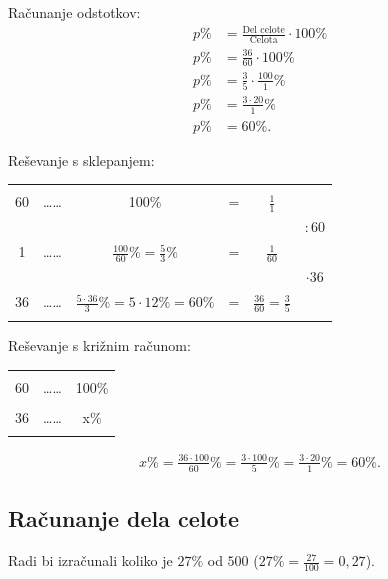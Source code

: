 \documentclass{article}
\begin{document}
Računanje odstotkov:
\begin{align*}
    p\% &= \frac{\text{Del celote}}{\text{Celota}} \cdot 100\%\\
    p\% &= \frac{36}{60} \cdot 100\%\\
    p\% &= \frac{3}{5} \cdot \frac{100}{1}\% \\
    p\% &= \frac{3 \cdot 20}{1} \%\\
    p\% &= 60\%.
\end{align*}

Reševanje s sklepanjem:
\begin{center}
    \begin{tabular}{ c c c c c c}
        &&&&&  \\
        60 & \dots\dots & 100\% & = & $\frac{1}{1}$\\ 
        &&&&&  $:60$ \\
        1 & \dots\dots & $\frac{100}{60}\%=\frac{5}{3}\%$ & = & $\frac{1}{60}$\\ 
        &&&&&  $\cdot 36$\\
        36 & \dots\dots & $\frac{5 \cdot 36}{3}\%=5\cdot12\%=60\%$ & = & $\frac{36}{60} = \frac{3}{5}$\\ 
        &&&&  \\
    \end{tabular}
\end{center}

Reševanje s križnim računom:
\begin{center}
    \begin{tabular}{ c c c  }
        && \\
        60 & \dots\dots & 100\% \\ 
        && \\
        36 & \dots\dots & x\% \\ 
        && \\
    \end{tabular}
\end{center}

\begin{align*}
    x\% = \frac{36 \cdot 100}{60}\% = \frac{3 \cdot 100}{5}\% = \frac{3 \cdot 20}{1}\% = 60\%.
\end{align*}

\pagebreak
\subsection{ Računanje dela celote }
Radi bi izračunali koliko je $27\%$ od $500$ ($27\% = \frac{27}{100} = 0,27$).
\end{document}

